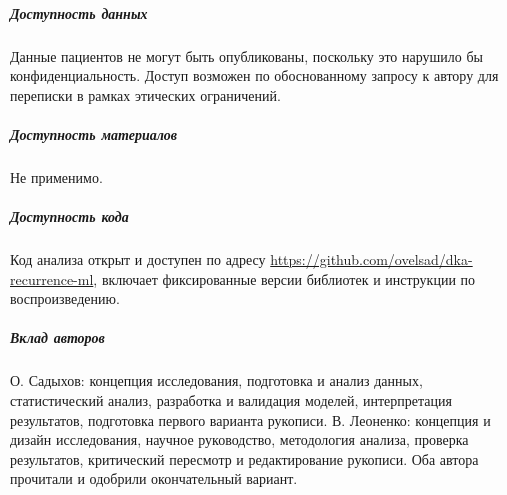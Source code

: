 \documentclass{crm-article}
\begin{document}
\subparagraph*{Доступность данных}

Данные пациентов не могут быть опубликованы, поскольку это нарушило бы конфиденциальность. Доступ возможен по обоснованному запросу к автору для переписки в рамках этических ограничений.

\subparagraph*{Доступность материалов}

Не применимо.

\subparagraph*{Доступность кода}

Код анализа открыт и доступен по адресу \url{https://github.com/ovelsad/dka-recurrence-ml}, включает фиксированные версии библиотек и инструкции по воспроизведению.

\subparagraph*{Вклад авторов}

О. Садыхов: концепция исследования, подготовка и анализ данных, статистический анализ, разработка и валидация моделей, интерпретация результатов, подготовка первого варианта рукописи. В. Леоненко: концепция и дизайн исследования, научное руководство, методология анализа, проверка результатов, критический пересмотр и редактирование рукописи. Оба автора прочитали и одобрили окончательный вариант.
\end{document}
